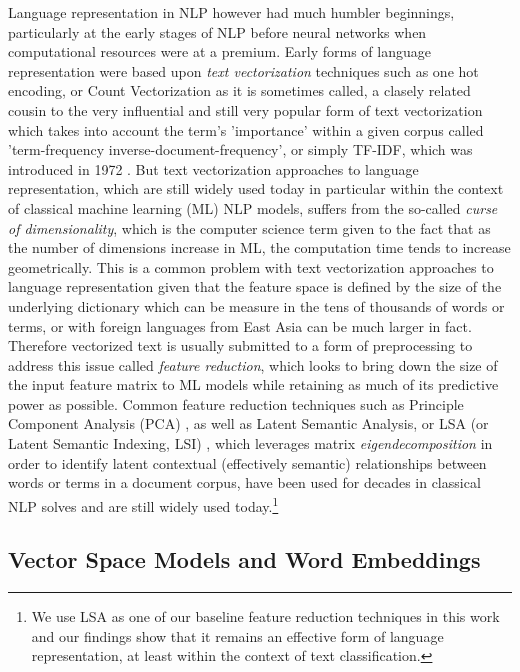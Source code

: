 \documentclass[final]{clv2025-revised}
\begin{document}
Language representation in NLP however had much humbler beginnings, particularly at the early stages of NLP before neural networks when computational resources were at a premium. Early forms of language representation were based upon \textit{text vectorization} techniques such as one hot encoding, or Count Vectorization as it is sometimes called, a clasely related cousin to the very influential and still very popular form of text vectorization which takes into account the term's 'importance' within a given corpus called 'term-frequency inverse-document-frequency', or simply TF-IDF, which was introduced in 1972 \cite{sparckjones1972statistical}. But text vectorization approaches to language representation, which are still widely used today in particular within the context of classical machine learning (ML) NLP models, suffers from the so-called \textit{curse of dimensionality}, which is the computer science term given to the fact that as the number of dimensions increase in ML, the computation time tends to increase geometrically. This is a common problem with text vectorization approaches to language representation given that the feature space is defined by the size of the underlying dictionary which can be measure in the tens of thousands of words or terms, or with foreign languages from East Asia can be much larger in fact. Therefore vectorized text is usually submitted to a form of preprocessing to address this issue called \textit{feature reduction}, which looks to bring down the size of the input feature matrix to ML models while retaining as much of its predictive power as possible. Common feature reduction techniques such as Principle Component Analysis (PCA) \cite{pearson01111901} \cite{hotelling1933AnalysisOA}, as well as Latent Semantic Analysis, or LSA (or Latent Semantic Indexing, LSI) \cite{deerwester}, which leverages matrix \textit{eigendecomposition} in order to identify latent contextual (effectively semantic) relationships between words or terms in a document corpus, have been used for decades in classical NLP solves and are still widely used today.\footnote{We use LSA as one of our baseline feature reduction techniques in this work and our findings show that it remains an effective form of language representation, at least within the context of text classification.}


\subsection{Vector Space Models and Word Embeddings}
\end{document}
